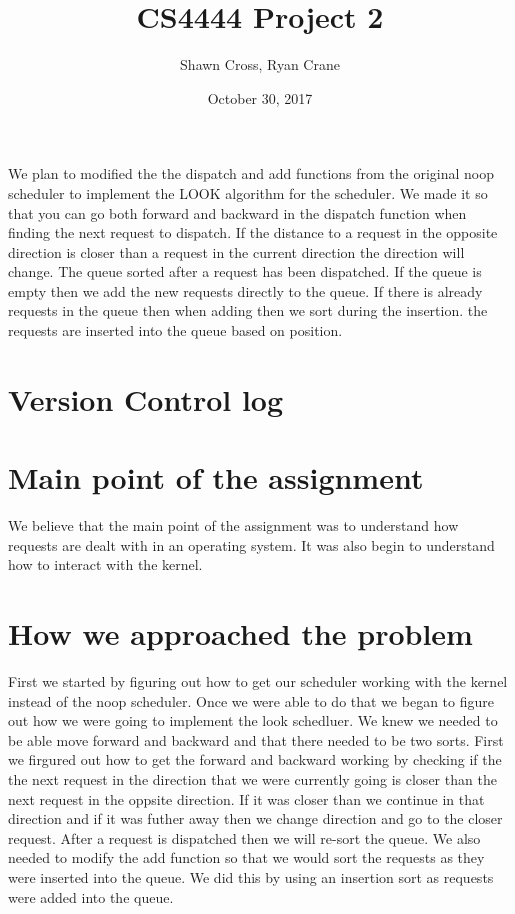 \documentclass[letterpaper,10pt,titlepage]{article}
\begin{document}
\title{CS4444 Project 2}
\date{October 30, 2017}
\author{Shawn Cross, Ryan Crane}
\maketitle

We plan to modified the the dispatch and add functions from the original noop 
scheduler to implement the LOOK algorithm for the scheduler. We made it so that 
you can go both forward and backward in the dispatch function when finding the 
next request to dispatch. If the distance to a request in the opposite 
direction is closer than a request in the current direction the direction will 
change. The queue sorted after a request has been dispatched. If the queue is 
empty then we add the new requests directly to the queue. If there is already 
requests in the queue then when adding then we sort during the insertion. the 
requests are inserted into the queue based on position. 

\section{Version Control log}


\section{Main point of the assignment}
We believe that the main point of the assignment was to understand how requests 
are dealt with in an operating system. It was also begin to understand how to 
interact with the kernel. 

\section{How we approached the problem}
First we started by figuring out how to get our scheduler working with the kernel 
instead of the noop scheduler. Once we were able to do that we began to figure 
out how we were going to implement the look schedluer. We knew we needed to be 
able move forward and backward and that there needed to be two sorts. First we 
firgured out how to get the forward and backward working by checking if the the 
next request in the direction that we were currently going is closer than the 
next request in the oppsite direction. If it was closer than we continue in that 
direction and if it was futher away then we change direction and go to the closer 
request. After a request is dispatched then we will re-sort the queue. We also 
needed to modify the add function so that we would sort the requests as they were 
inserted into the queue. We did this by using an insertion sort as requests were 
added into the queue.
\end{document}
